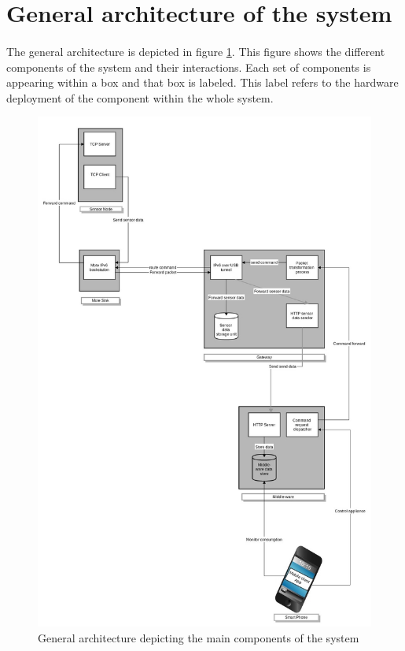 \documentclass[oneside,12pt,a4paper,final]{book}
\begin{document}
\section{General architecture of the system}
\paragraph{}
The general architecture is depicted in figure \ref{fig:gen_architecture}. This figure shows the different components of the system and their interactions. Each set of components is appearing within a box and that box is labeled. This label refers to the hardware deployment of the component within the whole system.
\begin{figure}[htbp]
\centering
\includegraphics[scale=0.40]{img/general_architecture.jpg}
\caption{General architecture depicting the main components of the system}
\label{fig:gen_architecture}
\end{figure}
\end{document}
